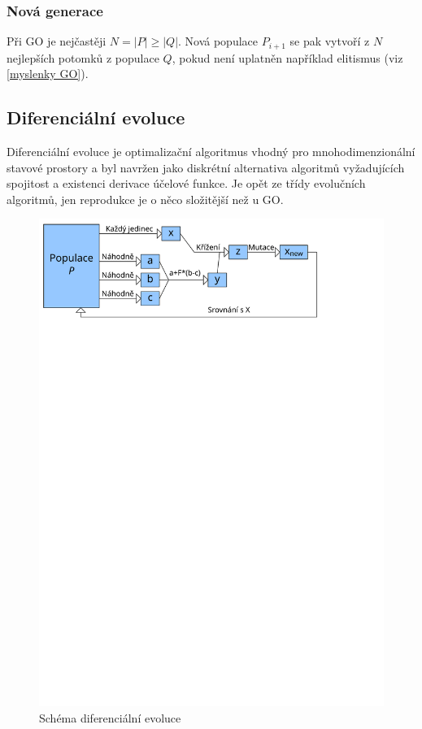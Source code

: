 \subsubsection{Nová generace}

Při GO je nejčastěji $N = |P| \geq |Q|$. Nová populace $P_{i+1}$ se pak vytvoří z $N$ nejlepších potomků z populace $Q$, pokud není uplatněn například elitismus (viz \ref{myslenky GO}).

\subsection{Diferenciální evoluce}

Diferenciální evoluce \cite{DE Storn} je optimalizační algoritmus vhodný pro mnohodimenzionální stavové prostory a byl navržen jako diskrétní alternativa algoritmů vyžadujících spojitost a existenci derivace účelové funkce. Je opět ze třídy evolučních algoritmů, jen reprodukce je o něco složitější než u GO.

\begin{figure}[h!]\label{DE fig}
  \includegraphics[width=\textwidth]{img/DE}
  \caption{Schéma diferenciální evoluce}
\end{figure}

